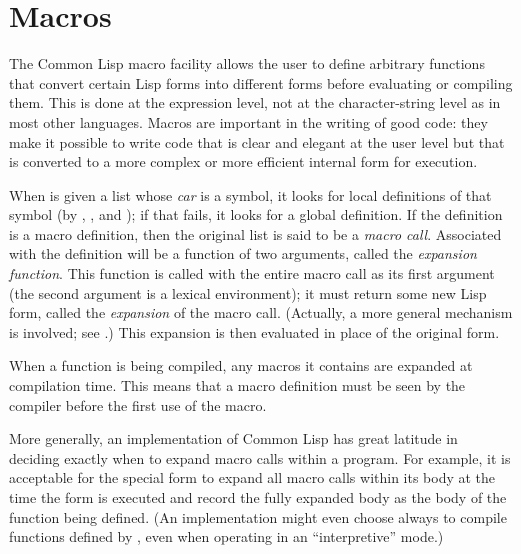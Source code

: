 
\clearpage\def\pagestatus{ULTIMATE}

\ifx \rulang\Undef

\chapter{Macros}
\label{MACROS}

The Common Lisp macro facility allows the user to define arbitrary
functions that convert certain Lisp forms into different forms before
evaluating or compiling them.  This is done at the expression level,
not at the character-string level as in most other languages.  Macros
are important in the writing of good code: they make it possible to
write code that is clear and elegant at the user level but that is
converted to a more complex or more efficient internal form for
execution.

When  is given a list whose \emph{car} is a symbol, it looks
for local definitions of that symbol (by , ,
and ); if that fails, it looks for a global definition.
If the definition is a macro definition, then the original
list is said to be a \emph{macro call}.  Associated with the definition
will be a function of two arguments, called the \emph{expansion function}.
This function is called with the entire macro call as its first argument
(the second argument is a lexical environment);
it must return some new Lisp form, called the \emph{expansion} of the
macro call.  (Actually, a more general mechanism is involved;
see .)
This expansion is then evaluated in place of the original
form.

When a function is being compiled, any macros it contains are expanded
at compilation time.  This means that a macro definition must be seen by the
compiler before the first use of the macro.

More generally, an implementation of Common Lisp has great latitude in deciding
exactly when to expand macro calls within a program.  For example,
it is acceptable for the  special form to expand all macro
calls within its body at the time the  form is executed
and record the fully expanded body as the body of the function
being defined.
(An implementation might even choose always to compile functions defined
by , even when operating in an ``interpretive'' mode.)

